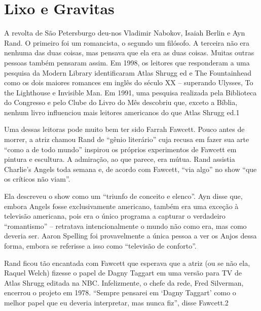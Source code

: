 \chapter{Lixo e Gravitas}\label{Lixo e Gravitas}
 \par 
A revolta de São Petersburgo deu-nos Vladimir Nabokov, Isaiah Berlin e Ayn Rand. O primeiro foi um romancista, o segundo um filósofo. A terceira não era nenhuma das duas coisas, mas pensava que ela era as duas coisas. Muitas outras pessoas também pensaram assim. Em 1998, os leitores que responderam a uma pesquisa da Modern Library identificaram Atlas Shrugg ed e The Fountainhead como os dois maiores romances em inglês do século XX – superando Ulysses, To the Lighthouse e Invisible Man. Em 1991, uma pesquisa realizada pela Biblioteca do Congresso e pelo Clube do Livro do Mês descobriu que, exceto a Bíblia, nenhum livro influenciou mais leitores americanos do que Atlas Shrugg ed.{\color{blue}1}
 \par 
Uma dessas leitoras pode muito bem ter sido Farrah Fawcett. Pouco antes de morrer, a atriz chamou Rand de “gênio literário” cuja recusa em fazer sua arte “como a de todo mundo” inspirou os próprios experimentos de Fawcett em pintura e escultura. A admiração, ao que parece, era mútua. Rand assistia Charlie’s Angels toda semana e, de acordo com Fawcett, “via algo” no show “que os críticos não viam”.
 \par 
Ela descreveu o show como um “triunfo de conceito e elenco”. Ayn disse que, embora Angels fosse exclusivamente americano, também era uma exceção à televisão americana, pois era o único programa a capturar o verdadeiro “romantismo” – retratava intencionalmente o mundo não como era, mas como deveria ser. Aaron Spelling foi provavelmente a única pessoa a ver os Anjos dessa forma, embora se referisse a isso como “televisão de conforto”.
 \par 
Rand ficou tão encantada com Fawcett que esperava que a atriz (ou se não ela, Raquel Welch) fizesse o papel de Dagny Taggart em uma versão para TV de Atlas Shrugg editada na NBC. Infelizmente, o chefe da rede, Fred Silverman, encerrou o projeto em 1978. “Sempre pensarei em ‘Dagny Taggart’ como o melhor papel que eu deveria interpretar, mas nunca fiz”, disse Fawcett.{\color{blue}2}
 \par 
